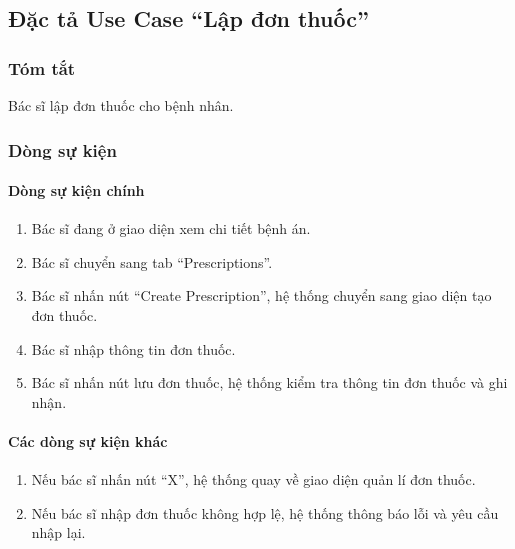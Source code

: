 \subsection{Đặc tả Use Case ``Lập đơn thuốc''}

\subsubsection{Tóm tắt}
Bác sĩ lập đơn thuốc cho bệnh nhân.

\subsubsection{Dòng sự kiện}
\paragraph{\textbf{Dòng sự kiện chính}}
\begin{enumerate}
  \item Bác sĩ đang ở giao diện xem chi tiết bệnh án.
  \item Bác sĩ chuyển sang tab ``Prescriptions''.
  \item Bác sĩ nhấn nút ``Create Prescription'', hệ thống chuyển sang giao diện tạo đơn thuốc.
  \item Bác sĩ nhập thông tin đơn thuốc.
  \item Bác sĩ nhấn nút lưu đơn thuốc, hệ thống kiểm tra thông tin đơn thuốc và ghi nhận.
\end{enumerate}

\paragraph{\textbf{Các dòng sự kiện khác}}
\begin{enumerate}
  \item Nếu bác sĩ nhấn nút ``X'', hệ thống quay về giao diện quản lí đơn thuốc.
  \item Nếu bác sĩ nhập đơn thuốc không hợp lệ, hệ thống thông báo lỗi và yêu cầu nhập lại.
\end{enumerate}

